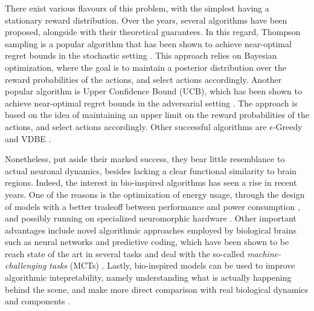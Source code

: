 There exist various flavours of this problem, with the simplest having a stationary reward distribution.
Over the years, several algorithms have been proposed, alongside with their theoretical guarantees.
In this regard, Thompson sampling is a popular algorithm that has been shown to achieve near-optimal regret bounds in the stochastic setting \cite{agrawalAnalysisThompsonSampling2012, kaufmannThompsonSamplingAsymptotically2012}.
This approach relies on Bayesian optimization, where the goal is to maintain a posterior distribution over the reward probabilities of the actions, and select actions accordingly.
Another popular algorithm is Upper Confidence Bound (UCB), which has been shown to achieve near-optimal regret bounds in the adversarial setting \cite{auerFinitetimeAnalysisMultiarmed2002}.
The approach is based on the idea of maintaining an upper limit on the reward probabilities of the actions, and select actions accordingly.
Other successful algorithms are $\epsilon$-Greedy and VDBE \cite{gittinsBanditProcessesDynamic1979, banMultifacetContextualBandits2021, tokicAdaptiveEGreedyExploration2010, tokicValueDifferenceBasedExploration2011}.

Nonetheless, put aside their marked success, they bear little resemblance to actual neuronal dynamics, besides lacking a clear functional similarity to brain regions.
Indeed, the interest in bio-inspired algorithms has seen a rise in recent years. One of the reasons is the optimization of energy usage, through the design of models with a better tradeoff between performance and power consumption \cite{EvaluationBioInspiredModels}, and possibly running on specialized neuromorphic hardware \cite{ReviewNeuroscienceInspiredMachine}.
Other important advantages include novel algorithmic approaches employed by biological brains such as neural networks and predictive coding, which have been shown to be reach state of the art in several tasks and deal with the so-called \textit{machine-challenging tasks} (MCTs) \cite{schmidgallBraininspiredLearningArtificial2024, hassabisNeuroscienceInspiredArtificialIntelligence2017, leeBraininspiredPredictiveCoding2022}.
Lastly, bio-inspired models can be used to improve algorithmic intepretability, namely understanding what is actually happening behind the scene, and make more direct comparison with real biological dynamics and components \cite{liuSeeingBelievingBrainInspired2023}.

